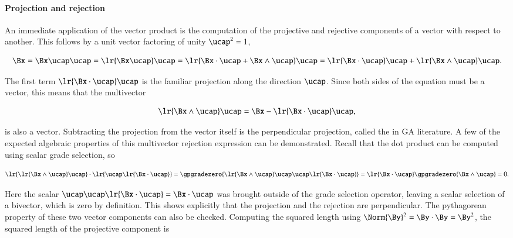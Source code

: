 \paragraph{Projection and rejection}

An immediate application of the vector product is the computation of the projective and rejective components of a vector with respect to another.  This follows by a unit vector factoring of unity \( \ucap^2 = 1 \),

\begin{dmath}\label{eqn:SimpleProducts2:680}
\Bx =
\Bx \ucap \ucap
=
\lr{ \Bx \ucap } \ucap
=
\lr{ \Bx \cdot \ucap + \Bx \wedge \ucap } \ucap
=
\lr{ \Bx \cdot \ucap } \ucap + \lr{ \Bx \wedge \ucap } \ucap.
\end{dmath}

The first term \( \lr{ \Bx \cdot \ucap } \ucap \) is the familiar projection along the direction \( \ucap \).  Since both sides of the equation must be a vector, this means that the multivector

\begin{dmath}\label{eqn:SimpleProducts2:700}
\lr{ \Bx \wedge \ucap } \ucap
=\Bx - \lr{ \Bx \cdot \ucap } \ucap,
\end{dmath}

is also a vector.  Subtracting the projection from the vector itself is the perpendicular projection, called the  in GA literature.  A few of the expected algebraic properties of this multivector rejection expression can be demonstrated.  Recall that the dot product can be computed using scalar grade selection, so

\begin{dmath}\label{eqn:SimpleProducts2:720}
\lr{ \lr{ \Bx \wedge \ucap } \ucap } \cdot \lr{ \ucap \lr{ \Bx \cdot \ucap } }
=
\gpgradezero{ \lr{ \Bx \wedge \ucap } \ucap \ucap \lr{ \Bx \cdot \ucap } }
=
\lr{ \Bx \cdot \ucap }
\gpgradezero{ \Bx \wedge \ucap }
= 0.
\end{dmath}

Here the scalar \( \ucap \ucap \lr{ \Bx \cdot \ucap } = \Bx \cdot \ucap \) was brought outside of the grade selection operator, leaving a scalar selection of a bivector, which is zero by definition.  This shows explicitly that the projection and the rejection are perpendicular.  The pythagorean property of these two vector components can also be checked.  Computing the squared length using \( \Norm{\By}^2 = \By \cdot \By = \By^2 \), the squared length of the projective component is

